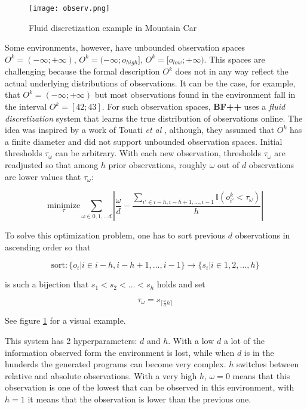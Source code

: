 \begin{figure}
    \centering
    \texttt{[image: observ.png]}
    \caption{Fluid discretization example in Mountain Car}
    \label{fig:obs}
\end{figure}

Some environments, however, have unbounded observation spaces $O^k=(-\infty;+\infty)$, $O^k=(-\infty;o_{high}]$,  $O^k=[o_{low};+\infty)$.
This spaces are challenging because the formal description $O^k$ does not in any way reflect the actual underlying distributions of observations.
It can be the case, for example, that $O^k=(-\infty;+\infty)$ but most observations found in the environment fall in the interval $O^k=[42;43]$.
For such observation spaces, \textbf{BF++} uses a \textit{fluid discretization} system that learns the true distribution of observations online. The idea was inspired by a work of Touati {\sl et al} \cite{adaptivediscretization}, although, they assumed that $O^k$ has a finite diameter and did not support unbounded observation spaces.
Initial thresholds $\tau_\omega$ can be arbitrary.
With each new observation, thresholds $\tau_\omega$ are readjusted so that among $h$ prior observations, roughly $\omega$ out of $d$  observations are lower values that $\tau_\omega$:

\begin{equation}
\underset{\tau}{\text{minimize}} \sum_{\omega \in 0,1,\dots d} |\frac{\omega}{d} - \frac{\sum_{i' \in i-h,i-h+1,\dots,i-1} \mathbb{I}(o_{i'}^k < \tau_\omega)}{h}|
\end{equation}

To solve this optimization problem, one has to sort previous $d$ observations in ascending order so that 

\begin{equation}
    \text{sort}: \{o_i | i \in i-h,i-h+1,\dots,i-1\} \longrightarrow \{ s_i | i \in 1,2,\dots,h \}
\end{equation}

is such a bijection that $s_1 < s_2 < \dots < s_h$ holds and set

\begin{equation}
    \tau_{\omega} = s_{\lceil \frac{\omega}{d} h \rceil}
\end{equation}

See figure \ref{fig:obs} for a visual example.


This system has 2 hyperparameters: $d$ and $h$.
With a low $d$ a lot of the information observed form the environment is lost, while when $d$ is in the hunderds the generated programs can become very complex.
$h$ switches between relative and absolute observations.
With a very high $h$, $\omega=0$ means that this observation is one of the lowest that can be observed in this environment, with $h=1$ it means that the observation is lower than the previous one.

